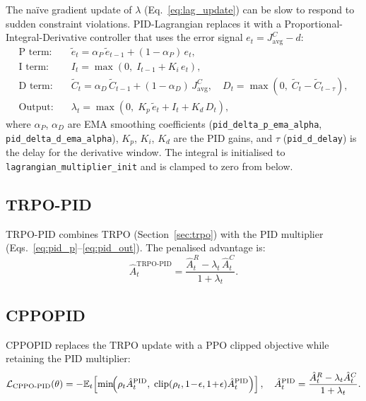 \documentclass[12pt,a4paper]{article}
\theoremstyle{definition}
\newcommand{\E}{\mathbb{E}}
\newcommand{\lagm}{\lambda}
\begin{document}
The na\"{i}ve gradient update of $\lagm$ (Eq.~\ref{eq:lag_update}) can be slow to respond
to sudden constraint violations. PID-Lagrangian replaces it with a
Proportional-Integral-Derivative controller that uses the error signal
$e_t = J^C_{\mathrm{avg}} - d$:
\begin{align}
  \text{P term:}\quad &\tilde{e}_t = \alpha_P\,\tilde{e}_{t-1} + (1-\alpha_P)\,e_t, \label{eq:pid_p}\\
  \text{I term:}\quad &I_t = \max(0,\; I_{t-1} + K_i\,e_t), \label{eq:pid_i}\\
  \text{D term:}\quad &\tilde{C}_t = \alpha_D\,\tilde{C}_{t-1} + (1-\alpha_D)\,J^C_{\mathrm{avg}},
  \quad D_t = \max(0,\;\tilde{C}_t - \tilde{C}_{t-\tau}), \label{eq:pid_d}\\
  \text{Output:}\quad &\lagm_t = \max\!\left(0,\; K_p\,\tilde{e}_t + I_t + K_d\,D_t\right), \label{eq:pid_out}
\end{align}
where $\alpha_P$, $\alpha_D$ are EMA smoothing coefficients (\texttt{pid\_delta\_p\_ema\_alpha},
\texttt{pid\_delta\_d\_ema\_alpha}), $K_p$, $K_i$, $K_d$ are the PID gains, and $\tau$
(\texttt{pid\_d\_delay}) is the delay for the derivative window. The integral is
initialised to \texttt{lagrangian\_multiplier\_init} and is clamped to zero from below.

\subsection{TRPO-PID}
\label{sec:trpopid}

TRPO-PID combines TRPO (Section~\ref{sec:trpo}) with the PID multiplier
(Eqs.~\ref{eq:pid_p}--\ref{eq:pid_out}). The penalised advantage is:
\begin{equation}
  \hat{A}_t^{\mathrm{TRPO\text{-}PID}} = \frac{\hat{A}_t^R - \lagm_t\,\hat{A}_t^C}{1+\lagm_t}.
\end{equation}

\subsection{CPPOPID}
\label{sec:cppopid}

CPPOPID replaces the TRPO update with a PPO clipped objective while retaining the PID
multiplier:
\begin{equation}
  \mathcal{L}_{\mathrm{CPPO\text{-}PID}}(\theta) = -\E_t\!\left[
    \min\!\Bigl(\rho_t\hat{A}_t^{\mathrm{PID}},\;\mathrm{clip}(\rho_t,1\!-\!\epsilon,1\!+\!\epsilon)\hat{A}_t^{\mathrm{PID}}\Bigr)
  \right],
  \quad \hat{A}_t^{\mathrm{PID}} = \frac{\hat{A}_t^R - \lagm_t\hat{A}_t^C}{1+\lagm_t}.
\end{equation}
\end{document}

